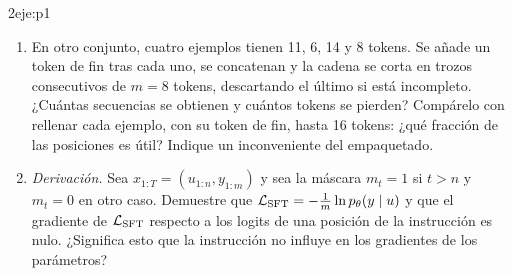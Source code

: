 \begin{ejercicio}{2}{eje:p1}
\begin{enumerate}[label=(\alph*)]
  \item {} En otro conjunto, cuatro ejemplos tienen 11, 6, 14 y 8 tokens. Se añade un token de fin tras cada uno, se concatenan y la cadena se corta en trozos consecutivos de $m=8$ tokens, descartando el último si está incompleto. ¿Cuántas secuencias se obtienen y cuántos tokens se pierden? Compárelo con rellenar cada ejemplo, con su token de fin, hasta 16 tokens: ¿qué fracción de las posiciones es útil? Indique un inconveniente del empaquetado.
  \item {} \emph{Derivación.} Sea $x_{1:T}=(u_{1:n},y_{1:m})$ y sea la máscara $m_t=1$ si $t>n$ y $m_t=0$ en otro caso. Demuestre que $\mathcal{L}_{\mathrm{SFT}}=-\frac{1}{m}\ln p_\theta(y\mid u)$ y que el gradiente de $\mathcal{L}_{\mathrm{SFT}}$ respecto a los logits de una posición de la instrucción es nulo. ¿Significa esto que la instrucción no influye en los gradientes de los parámetros?
\end{enumerate}
\end{ejercicio}

